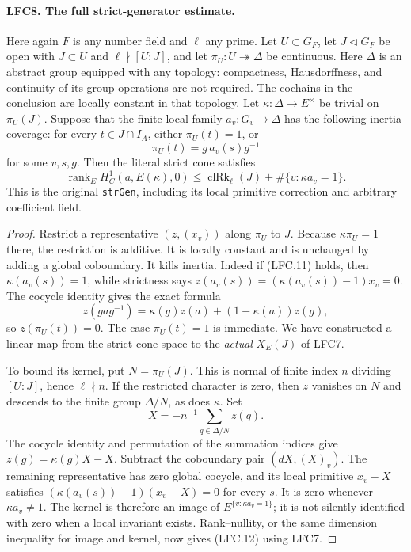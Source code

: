 \documentclass[11pt,a4paper]{article}
\numberwithin{equation}{section}
\theoremstyle{remark}\newtheorem{remark}[theorem]{Remark}
\begin{document}
\paragraph{LFC8. The full strict-generator estimate.}
\label{claim:LFC8}
Here again \(F\) is any number field and \(\ell\) any prime.
Let \(U\subset G_F\), let \(J\triangleleft G_F\) be open with
\(J\subset U\) and \(\ell\nmid[U:J]\), and let
\(\pi_U:U\twoheadrightarrow\Delta\) be continuous.
Here \(\Delta\) is an abstract group equipped with any topology:
compactness, Hausdorffness, and continuity of its group operations
are not required.  The cochains in the conclusion are locally
constant in that topology.
Let \(\kappa:\Delta\to E^\times\) be trivial on \(\pi_U(J)\).
Suppose that the finite local family \(a_v:G_v\to\Delta\)
has the following inertia coverage: for every
\(t\in J\cap I_A\), either \(\pi_U(t)=1\), or
\[
                    \pi_U(t)=g\,a_v(s)g^{-1}
                                                        \tag{LFC.11}
\]
for some \(v,s,g\).  Then the literal strict cone satisfies
\[
 \operatorname{rank}_E H^1_C(a,E(\kappa),0)
 \le \operatorname{clRk}_\ell(J)
           +\#\{v:\kappa a_v=1\}.                       \tag{LFC.12}
\]
This is the original \texttt{str\allowbreak Gen}, including its local
primitive correction and arbitrary coefficient field.

\begin{proof}
Restrict a representative \((z,(x_v))\) along \(\pi_U\) to \(J\).
Because \(\kappa\pi_U=1\) there, the restriction is additive.
It is locally constant and is unchanged by adding a
global coboundary.  It kills inertia.  Indeed if (LFC.11)
holds, then \(\kappa(a_v(s))=1\), while strictness says
\(z(a_v(s))=(\kappa(a_v(s))-1)x_v=0\).
The cocycle identity gives the exact formula
\[
 z(gag^{-1})=\kappa(g)z(a)+(1-\kappa(a))z(g),             \tag{LFC.13}
\]
so \(z(\pi_U(t))=0\).  The case \(\pi_U(t)=1\) is immediate.
We have constructed a linear map from the strict cone
space to the \emph{actual} \(X_E(J)\) of LFC7.

To bound its kernel, put \(N=\pi_U(J)\).  This is normal
of finite index \(n\) dividing \([U:J]\), hence
\(\ell\nmid n\).  If the restricted character is zero,
then \(z\) vanishes on \(N\) and descends to
the finite group \(\Delta/N\), as does \(\kappa\).
Set
\[
           X=-n^{-1}\sum_{q\in\Delta/N}z(q).
\]
The cocycle identity and permutation of the summation
indices give \(z(g)=\kappa(g)X-X\).
Subtract the coboundary pair \((dX,(X)_v)\).
The remaining representative has zero global cocycle,
and its local primitive \(x_v-X\) satisfies
\((\kappa(a_v(s))-1)(x_v-X)=0\) for every \(s\).
It is zero whenever \(\kappa a_v\ne1\).
The kernel is therefore an image of
\(E^{\{v:\kappa a_v=1\}}\); it is not silently identified
with zero when a local invariant exists.
Rank--nullity, or the same dimension inequality for image
and kernel, now gives (LFC.12) using LFC7.
\end{proof}
\end{document}
